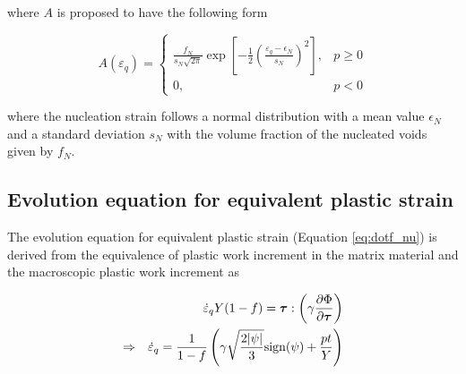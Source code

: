 where $A$ is proposed to have the following form

\begin{equation}
A(\varepsilon_q) =
	\begin{cases}
		\frac{f_N}{s_N\sqrt{2\pi}}\exp\left[ -\frac{1}{2}\left( \frac{\varepsilon_q - \epsilon_N}{s_N}\right)^2\right], & p \geq 0\\
		0,	  & p <0
	\end{cases}
\end{equation}

where the nucleation strain follows a normal distribution with a mean value $\epsilon_N$ and a standard deviation $s_N$ with the volume fraction of the nucleated voids given by $f_N$.\\

\subsection{Evolution equation for equivalent plastic strain}
The evolution equation for equivalent plastic strain (Equation \eqref{eq:dotf_nu}) is derived from the equivalence of plastic work increment in the matrix material and the macroscopic plastic work increment as

\begin{eqnarray}\label{eq:dotepsilon}
&&\dot{\varepsilon}_q Y(1-f) = {\boldsymbol{\tau}} : \left( \gamma\frac{\partial\Phi}{\partial{\boldsymbol{\tau}}} \right)\\
\Rightarrow &&\dot{\varepsilon}_q =\frac{1}{1-f}\left( \gamma\sqrt{\frac{2|\psi|}{3}} {\rm sign}(\psi) + \frac{p t}{Y} \right) 
\end{eqnarray}


